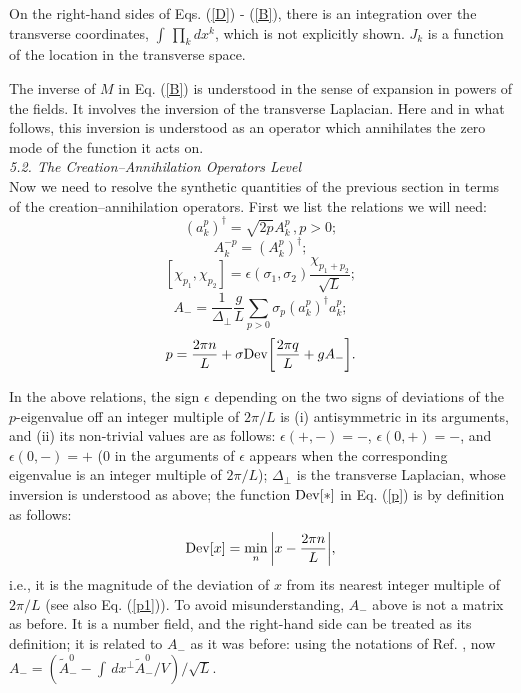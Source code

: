 \documentclass[a4paper,12pt]{article}
\begin{document}
On the right-hand sides of Eqs. (\ref{D}) - (\ref{B}), 
there is an integration over the transverse coordinates, 
$\int\,\prod_k dx^k$, 
which is not explicitly shown. $J_k$ is a function of the
location in the transverse space.

The inverse of $M$ in Eq. (\ref{B}) is understood in the sense of 
expansion in powers of the fields. It involves the inversion of the 
transverse Laplacian. Here and in what follows, this inversion is 
understood as an operator which annihilates the zero mode of
the function it acts on. \\


{\it 5.2. The Creation--Annihilation Operators Level }\\

Now we need to resolve the synthetic quantities of the previous section in terms of 
the creation--annihilation operators. First we list the relations we will need:
\begin{equation}
\label{creation}
(a^p_k)^\dagger = \sqrt{2p}A^p_k\,, p>0;
\end{equation}
\begin{equation}
\label{conjugation}
A^{-p}_k = (A^p_k)^\dagger;
\end{equation}
\begin{equation}
\label{commutator}
[\chi_{p_1},\chi_{p_2}]=\epsilon(\sigma_1,\sigma_2)
\frac{\chi_{p_1+p_2}}{\sqrt{L}};
\end{equation}
\begin{equation}
\label{aminus}
A_- = \frac{1}{\Delta_\perp}\frac{g}{L}\sum_{p>0}
\sigma_p(a^p_k)^\dagger a^p_k;
\end{equation}
\begin{equation}
\label{p}
p=\frac{2\pi n}{L} + \sigma 
{\rm Dev} \bigg[\frac{2\pi q}{L} + gA_- \bigg].
\end{equation}

In the above relations, the sign $\epsilon$ depending on the two signs of 
deviations of the $p$-eigenvalue off an integer multiple 
of $2\pi/L$ is (i) antisymmetric in its arguments, and (ii) its 
non-trivial values are as follows: 
$\epsilon(+,-) = -$, $\epsilon(0,+) = -$, 
and $\epsilon(0,-) = +$ ($0$ in the arguments of $\epsilon$ appears when 
the corresponding eigenvalue is an
integer multiple of $2\pi/L$); $\Delta_\perp$ is the 
transverse Laplacian,  whose
inversion is understood as above; 
the function ${\rm Dev}[*]$ in Eq. (\ref{p}) 
is by definition as follows:
\begin{equation}
\label{dev}
{\rm Dev}[x] = \min_n \bigg|x -\frac{2\pi n}{L} \bigg|,
\end{equation}   
i.e., it is the magnitude of the deviation of $x$ from its 
nearest integer multiple of 
$2\pi/L$ 
(see also Eq. (\ref{p1})). To avoid misunderstanding, $A_-$ above is 
not a matrix as before. It is a number field, and the right-hand side can be
treated as its definition; it is related to $A_-$ as it was before: 
using the notations of 
Ref. \cite{KMPV}, now $A_- = (\tilde {A}^0_- - \int\,dx^\perp
\tilde {A}^0_- /V)/\sqrt{L}$.
\end{document}
